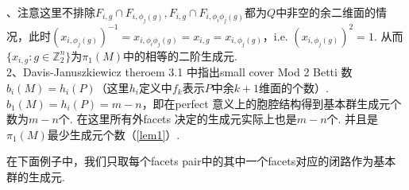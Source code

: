 \documentclass{article}
\theoremstyle{plain}%
\theoremstyle{definition}
\theoremstyle{remark}
\begin{document}
{、注意这里不排除$F_{i,g}\cap F_{i,\phi_j(g)}, F_{i,g}\cap F_{i,\phi_i\phi_j(g)}$都为$Q$中非空的余二维面的情况，此时$(x_{i,\phi_j(g)})^{-1}=x_{i,\phi_i\phi_j(g)}=x_{i,g}=x_{i,\phi_j(g)}$，i.e. $(x_{i,\phi_j(g)})^{2}=1$. 从而$\{x_{i,g}:g\in\mathbb{Z}_2^n\}$为$\pi_1(M)$中的相等的二阶生成元. \\
2、Davis-Januszkiewicz \cite{DJ1} theroem 3.1 中指出small cover Mod 2 Betti 数$b_i(M)=h_i(P)$（这里$h_i$定义中$f_k$表示$P$中余$k+1$维面的个数）. $b_1(M)=h_i(P)=m-n$，即在perfect 意义上的胞腔结构得到基本群生成元个数为$m-n$个. 在这里所有外facets 决定的生成元实际上也是$m-n$个. 并且是$\pi_1(M)$最少生成元个数（\ref{lem1}）.
}

在下面例子中，我们只取每个facets pair中的其中一个facets对应的闭路作为基本群的生成元.
\end{document}
